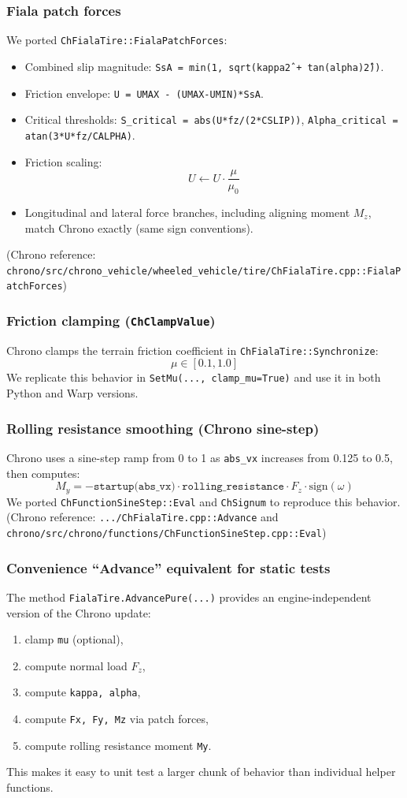 \subsubsection{Fiala patch forces}
We ported \texttt{ChFialaTire::FialaPatchForces}:
\begin{itemize}
  \item Combined slip magnitude: \texttt{SsA = min(1, sqrt(kappa\^2 + tan(alpha)\^2))}.
  \item Friction envelope: \texttt{U = UMAX - (UMAX-UMIN)*SsA}.
  \item Critical thresholds:
    \texttt{S\_critical = abs(U*fz/(2*CSLIP))},
    \texttt{Alpha\_critical = atan(3*U*fz/CALPHA)}.
  \item Friction scaling:
    \[
      U \leftarrow U \cdot \frac{\mu}{\mu_0}
    \]
  \item Longitudinal and lateral force branches, including aligning moment $M_z$, match Chrono exactly (same sign conventions).
\end{itemize}
(Chrono reference: \texttt{chrono/src/chrono\_vehicle/wheeled\_vehicle/tire/ChFialaTire.cpp::FialaPatchForces})

\subsubsection{Friction clamping (\texttt{ChClampValue})}
Chrono clamps the terrain friction coefficient in \texttt{ChFialaTire::Synchronize}:
\[
  \mu \in [0.1, 1.0]
\]
We replicate this behavior in \texttt{SetMu(..., clamp\_mu=True)} and use it in both Python and Warp versions.

\subsubsection{Rolling resistance smoothing (Chrono sine-step)}
Chrono uses a sine-step ramp from 0 to 1 as \texttt{abs\_vx} increases from 0.125 to 0.5, then computes:
\[
  M_y = -\texttt{startup(abs\_vx)} \cdot \texttt{rolling\_resistance} \cdot F_z \cdot \mathrm{sign}(\omega)
\]
We ported \texttt{ChFunctionSineStep::Eval} and \texttt{ChSignum} to reproduce this behavior.
(Chrono reference: \texttt{.../ChFialaTire.cpp::Advance} and \texttt{chrono/src/chrono/functions/ChFunctionSineStep.cpp::Eval})

\subsubsection{Convenience ``Advance'' equivalent for static tests}
The method \texttt{FialaTire.AdvancePure(...)} provides an engine-independent version of the Chrono update:
\begin{enumerate}
  \item clamp \texttt{mu} (optional),
  \item compute normal load $F_z$,
  \item compute \texttt{kappa, alpha},
  \item compute \texttt{Fx, Fy, Mz} via patch forces,
  \item compute rolling resistance moment \texttt{My}.
\end{enumerate}
This makes it easy to unit test a larger chunk of behavior than individual helper functions.

